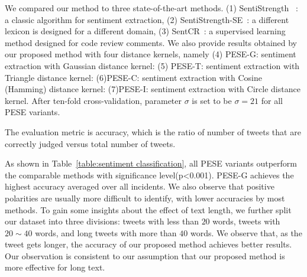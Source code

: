 \documentclass[runningheads]{llncs}
\begin{document}
We compared our method to three state-of-the-art methods. (1) SentiStrength ~\cite{sentistrength2010}: a classic algorithm for sentiment extraction, (2) SentiStrength-SE~\cite{Rakibul2017SentiStrength-SE}: a different lexicon is designed for a different domain, (3) SentCR~\cite{Ahmed2017SentiCR}:  a supervised learning method designed for code review comments. 
We also provide results obtained by our proposed method with four distance kernels, namely (4) PESE-G: sentiment extraction with Gaussian distance kernel: (5) PESE-T: sentiment extraction with Triangle distance kernel: (6)PESE-C: sentiment extraction with Cosine (Hamming) distance kernel: (7)PESE-I: sentiment extraction with Circle distance kernel. After ten-fold cross-validation, parameter $\sigma$ is set to be $\sigma=21$ for all PESE variants.

The evaluation metric is accuracy, which is the ratio of number of tweets that are correctly judged versus total number of tweets.%


As shown in Table~\ref{table:sentiment classification}, all PESE variants outperform the comparable methods with significance level(p<0.001).
PESE-G achieves the highest accuracy averaged over all incidents. 
We also observe that positive polarities are usually more difficult to identify, with lower accuracies by most methods. 
To gain some insights about the effect of text length, we further split our dataset into three divisions: tweets with less than $20$ words, tweets with $20\sim 40$ words, and long tweets with more than $40$ words.
We observe that, as the tweet gets longer, the accuracy of our proposed method achieves better results. Our observation is consistent to our assumption that our proposed method is more effective for long text.
\end{document}
